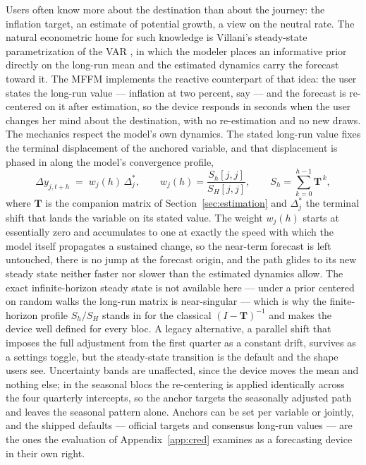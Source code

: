 \documentclass[11pt]{article}
\begin{document}
Users often know more about the destination than about the journey: the inflation target,
an estimate of potential growth, a view on the neutral rate. The natural econometric home
for such knowledge is Villani's steady-state parametrization of the VAR
\citep{Villani2009}, in which the modeler places an informative prior directly on the
long-run mean and the estimated dynamics carry the forecast toward it. The MFFM implements
the reactive counterpart of that idea: the user states the long-run value --- inflation at
two percent, say --- and the forecast is re-centered on it after estimation, so the device
responds in seconds when the user changes her mind about the destination, with no
re-estimation and no new draws. The mechanics respect the model's own dynamics. The stated
long-run value fixes the terminal displacement of the anchored variable, and that
displacement is phased in along the model's convergence profile,
\begin{equation}\label{eq:anchor}
  \Delta y_{j,t+h} \;=\; w_j(h)\,\Delta^{*}_{j}, \qquad
  w_j(h)=\frac{S_h[j,j]}{S_H[j,j]}, \qquad
  S_h=\textstyle\sum_{k=0}^{h-1}\mathbf T^{\,k},
\end{equation}
where $\mathbf T$ is the companion matrix of Section~\ref{sec:estimation} and
$\Delta^{*}_{j}$ the terminal shift that lands the variable on its stated value. The weight
$w_j(h)$ starts at essentially zero and accumulates to one at exactly the speed with which
the model itself propagates a sustained change, so the near-term forecast is left
untouched, there is no jump at the forecast origin, and the path glides to its new steady
state neither faster nor slower than the estimated dynamics allow. The exact infinite-horizon
steady state is not available here --- under a prior centered on random walks the long-run
matrix is near-singular --- which is why the finite-horizon profile $S_h/S_H$ stands in for
the classical $(I-\mathbf T)^{-1}$ and makes the device well defined for every bloc. A
legacy alternative, a parallel shift that imposes the full adjustment from the first
quarter as a constant drift, survives as a settings toggle, but the steady-state transition
is the default and the shape users see. Uncertainty bands are unaffected, since the device
moves the mean and nothing else; in the seasonal blocs the re-centering is applied
identically across the four quarterly intercepts, so the anchor targets the seasonally
adjusted path and leaves the seasonal pattern alone. Anchors can be set per variable or
jointly, and the shipped defaults --- official targets and consensus long-run values ---
are the ones the evaluation of Appendix~\ref{app:cred} examines as a forecasting device in
their own right.
\end{document}
